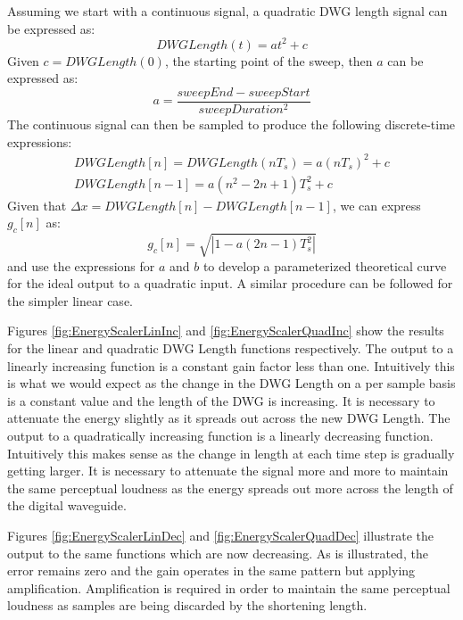 \documentclass[../main.tex]{subfiles}
\begin{document}
Assuming we start with a continuous signal, a quadratic DWG length signal can be expressed as:
\begin{equation}
    DWGLength(t) = at^2 + c 
\end{equation}
Given $c = DWGLength(0)$,  the starting point of the sweep, then $a$ can be expressed as:
\begin{equation}
    a = \frac{sweepEnd - sweepStart}{sweepDuration^2}
\end{equation}
The continuous signal can then be sampled to produce the following discrete-time expressions:
\begin{align}
    DWGLength[n] = DWGLength(nT_s) = a(nT_s)^2 + c\\
    DWGLength[n-1] = a(n^2 - 2n + 1)T_s^2 + c
\end{align}
Given that $\Delta x = DWGLength[n] - DWGLength[n-1]$, we can express $g_c[n]$ as:
\begin{equation}
    g_c[n] = \sqrt{|1-a(2n-1)T_s^2|}
\end{equation}
and use the expressions for $a$ and $b$ to develop a parameterized theoretical curve for the ideal output to a quadratic input. A similar procedure can be followed for the simpler linear case.

Figures \ref{fig:EnergyScalerLinInc} and \ref{fig:EnergyScalerQuadInc} show the results for the linear and quadratic DWG Length functions respectively. The output to a linearly increasing function is a constant gain factor less than one. Intuitively this is what we would expect as the change in the DWG Length on a per sample basis is a constant value and the length of the DWG is increasing. It is necessary to attenuate the energy slightly as it spreads out across the new DWG Length. The output to a quadratically increasing function is a linearly decreasing function. Intuitively this makes sense as the change in length at each time step is gradually getting larger. It is necessary to attenuate the signal more and more to maintain the same perceptual loudness as the energy spreads out more across the length of the digital waveguide. 

Figures \ref{fig:EnergyScalerLinDec} and \ref{fig:EnergyScalerQuadDec} illustrate the output to the same functions which are now decreasing. As is illustrated, the error remains zero and the gain operates in the same pattern but applying amplification. Amplification is required in order to maintain the same perceptual loudness as samples are being discarded by the shortening length.
\end{document}
